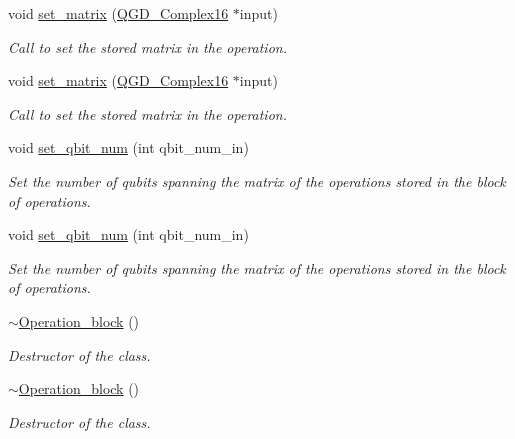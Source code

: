 \begin{DoxyCompactItemize}
void \hyperlink{class_operation_a026d3dcf0ad00af99c7a9097d3cf1c74}{set\+\_\+matrix} (\hyperlink{struct_q_g_d___complex16}{Q\+G\+D\+\_\+\+Complex16} $\ast$input)
\begin{DoxyCompactList}\small\item\em Call to set the stored matrix in the operation. \end{DoxyCompactList}\item 
void \hyperlink{class_operation_a026d3dcf0ad00af99c7a9097d3cf1c74}{set\+\_\+matrix} (\hyperlink{struct_q_g_d___complex16}{Q\+G\+D\+\_\+\+Complex16} $\ast$input)
\begin{DoxyCompactList}\small\item\em Call to set the stored matrix in the operation. \end{DoxyCompactList}\item 
void \hyperlink{class_operation__block_acc41ac933723558df3f4e65ae1158091}{set\+\_\+qbit\+\_\+num} (int qbit\+\_\+num\+\_\+in)
\begin{DoxyCompactList}\small\item\em Set the number of qubits spanning the matrix of the operations stored in the block of operations. \end{DoxyCompactList}\item 
void \hyperlink{class_operation__block_acc41ac933723558df3f4e65ae1158091}{set\+\_\+qbit\+\_\+num} (int qbit\+\_\+num\+\_\+in)
\begin{DoxyCompactList}\small\item\em Set the number of qubits spanning the matrix of the operations stored in the block of operations. \end{DoxyCompactList}\item 
\hyperlink{class_operation__block_a45267880235adbe428861c9838ae0459}{$\sim$\+Operation\+\_\+block} ()
\begin{DoxyCompactList}\small\item\em Destructor of the class. \end{DoxyCompactList}\item 
\hyperlink{class_operation__block_a45267880235adbe428861c9838ae0459}{$\sim$\+Operation\+\_\+block} ()
\begin{DoxyCompactList}\small\item\em Destructor of the class. \end{DoxyCompactList}\end{DoxyCompactItemize}
